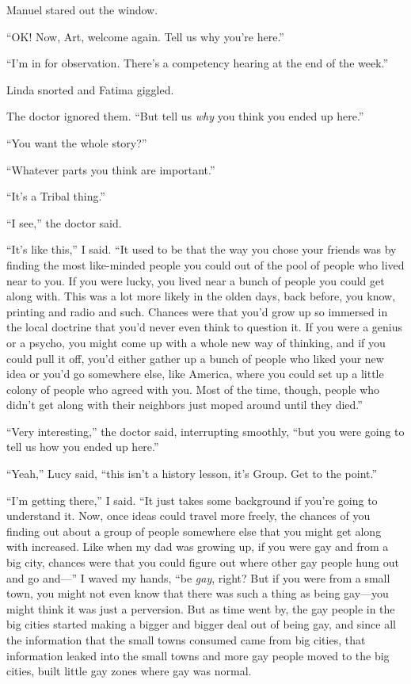 Manuel stared out the window.

“OK! Now, Art, welcome again. Tell us why you’re here.”

“I’m in for observation. There’s a competency hearing at the end of
the week.”

Linda snorted and Fatima giggled.

The doctor ignored them. “But tell us \emph{why} you think you
ended up here.”

“You want the whole story?”

“Whatever parts you think are important.”

“It’s a Tribal thing.”

“I see,” the doctor said.

“It’s like this,” I said. “It used to be that the way you chose
your friends was by finding the most like-minded people you could
out of the pool of people who lived near to you. If you were lucky,
you lived near a bunch of people you could get along with. This was
a lot more likely in the olden days, back before, you know,
printing and radio and such. Chances were that you’d grow up so
immersed in the local doctrine that you’d never even think to
question it. If you were a genius or a psycho, you might come up
with a whole new way of thinking, and if you could pull it off,
you’d either gather up a bunch of people who liked your new idea or
you’d go somewhere else, like America, where you could set up a
little colony of people who agreed with you. Most of the time,
though, people who didn’t get along with their neighbors just moped
around until they died.”

“Very interesting,” the doctor said, interrupting smoothly, “but
you were going to tell us how you ended up here.”

“Yeah,” Lucy said, “this isn’t a history lesson, it’s Group. Get to
the point.”

“I’m getting there,” I said. “It just takes some background if
you’re going to understand it. Now, once ideas could travel more
freely, the chances of you finding out about a group of people
somewhere else that you might get along with increased. Like when
my dad was growing up, if you were gay and from a big city, chances
were that you could figure out where other gay people hung out and
go and—” I waved my hands, “be \emph{gay}, right? But if you were
from a small town, you might not even know that there was such a
thing as being gay—you might think it was just a perversion. But as
time went by, the gay people in the big cities started making a
bigger and bigger deal out of being gay, and since all the
information that the small towns consumed came from big cities,
that information leaked into the small towns and more gay people
moved to the big cities, built little gay zones where gay was
normal.

